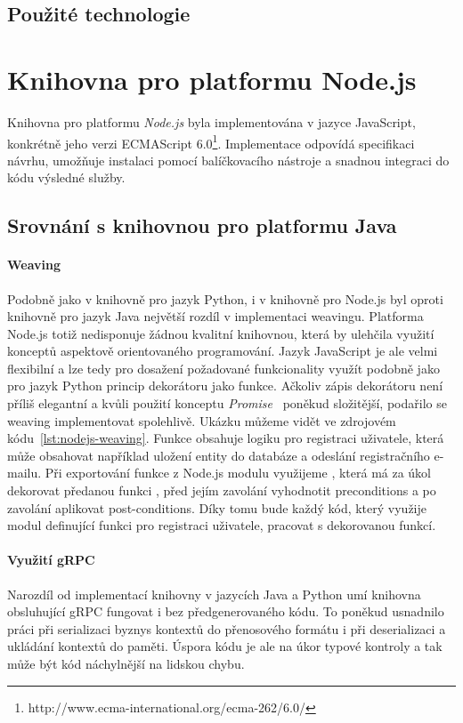 \subsection{Použité technologie}

\section{Knihovna pro platformu Node.js}

Knihovna pro platformu \textit{Node.js} byla implementována
v jazyce JavaScript, konkrétně jeho verzi
ECMAScript 6.0\footnote{http://www.ecma-international.org/ecma-262/6.0/}.
Implementace odpovídá specifikaci návrhu, umožňuje
instalaci pomocí balíčkovacího nástroje a snadnou
integraci do kódu výsledné služby.

\subsection{Srovnání s knihovnou pro platformu Java}

\paragraph{Weaving} Podobně jako v knihovně pro jazyk Python,
i v knihovně pro Node.js byl oproti knihovně pro jazyk Java
největší rozdíl v implementaci weavingu. Platforma Node.js
totiž nedisponuje žádnou kvalitní knihovnou, která by ulehčila
využití konceptů aspektově orientovaného programování.
Jazyk JavaScript je ale velmi flexibilní a lze
tedy pro dosažení požadované funkcionality využít
podobně jako pro jazyk Python princip dekorátoru jako funkce.
Ačkoliv zápis dekorátoru není příliš elegantní a kvůli
použití konceptu \textit{Promise}~\cite{kambona2013evaluation}
poněkud složitější, podařilo se weaving implementovat spolehlivě.
Ukázku můžeme vidět ve zdrojovém kódu~\ref{lst:nodejs-weaving}.
Funkce  obsahuje logiku pro registraci uživatele,
která může obsahovat například uložení entity do databáze a odeslání
registračního e-mailu. Při exportování funkce z Node.js modulu
využijeme , která má za úkol dekorovat
předanou funkci , před jejím zavolání vyhodnotit
preconditions a po zavolání aplikovat post-conditions.
Díky tomu bude každý kód, který využije modul definující funkci
pro registraci uživatele, pracovat s dekorovanou funkcí.

\paragraph{Využití gRPC} Narozdíl od implementací knihovny
v jazycích Java a Python umí knihovna obsluhující gRPC
fungovat i bez předgenerovaného kódu. To poněkud usnadnilo
práci při serializaci byznys kontextů do přenosového formátu
i při deserializaci a ukládání kontextů do paměti. Úspora
kódu je ale na úkor typové kontroly a tak může být kód náchylnější
na lidskou chybu.

